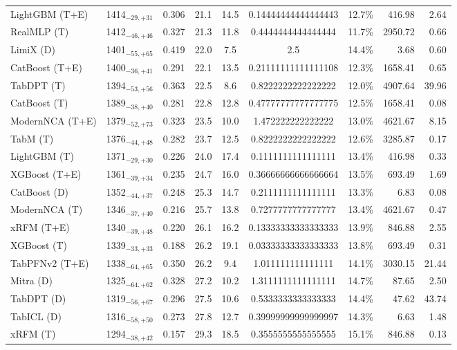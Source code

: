 \begin{tabular}{llcccccrr}
LightGBM (T+E) & 1414${}_{-29,+31}$ & 0.306 & 21.1 & 14.5 & 0.14444444444444443 & 12.7\% & 416.98 & 2.64 \\
RealMLP (T) & 1412${}_{-46,+46}$ & 0.327 & 21.3 & 11.8 & 0.4444444444444444 & 11.7\% & 2950.72 & 0.66 \\
LimiX (D) & 1401${}_{-55,+65}$ & 0.419 & 22.0 & 7.5 & 2.5 & 14.4\% & 3.68 & 0.60 \\
CatBoost (T+E) & 1400${}_{-36,+41}$ & 0.291 & 22.1 & 13.5 & 0.21111111111111108 & 12.3\% & 1658.41 & 0.65 \\
TabDPT (T) & 1394${}_{-53,+56}$ & 0.363 & 22.5 & 8.6 & 0.8222222222222222 & 12.0\% & 4907.64 & 39.96 \\
CatBoost (T) & 1389${}_{-38,+40}$ & 0.281 & 22.8 & 12.8 & 0.47777777777777775 & 12.5\% & 1658.41 & 0.08 \\
ModernNCA (T+E) & 1379${}_{-52,+73}$ & 0.323 & 23.5 & 10.0 & 1.472222222222222 & 13.0\% & 4621.67 & 8.15 \\
TabM (T) & 1376${}_{-44,+48}$ & 0.282 & 23.7 & 12.5 & 0.8222222222222222 & 12.6\% & 3285.87 & 0.17 \\
LightGBM (T) & 1371${}_{-29,+30}$ & 0.226 & 24.0 & 17.4 & 0.1111111111111111 & 13.4\% & 416.98 & 0.33 \\
XGBoost (T+E) & 1361${}_{-39,+34}$ & 0.235 & 24.7 & 16.0 & 0.36666666666666664 & 13.5\% & 693.49 & 1.69 \\
CatBoost (D) & 1352${}_{-44,+37}$ & 0.248 & 25.3 & 14.7 & 0.2111111111111111 & 13.3\% & 6.83 & 0.08 \\
ModernNCA (T) & 1346${}_{-37,+40}$ & 0.216 & 25.7 & 13.8 & 0.7277777777777777 & 13.4\% & 4621.67 & 0.47 \\
xRFM (T+E) & 1340${}_{-39,+48}$ & 0.220 & 26.1 & 16.2 & 0.13333333333333333 & 13.9\% & 846.88 & 2.55 \\
XGBoost (T) & 1339${}_{-33,+33}$ & 0.188 & 26.2 & 19.1 & 0.03333333333333333 & 13.8\% & 693.49 & 0.31 \\
TabPFNv2 (T+E) & 1338${}_{-64,+65}$ & 0.350 & 26.2 & 9.4 & 1.011111111111111 & 14.1\% & 3030.15 & 21.44 \\
Mitra (D) & 1325${}_{-64,+62}$ & 0.328 & 27.2 & 10.2 & 1.3111111111111111 & 14.7\% & 87.65 & 2.50 \\
TabDPT (D) & 1319${}_{-56,+67}$ & 0.296 & 27.5 & 10.6 & 0.5333333333333333 & 14.4\% & 47.62 & 43.74 \\
TabICL (D) & 1316${}_{-58,+50}$ & 0.273 & 27.8 & 12.7 & 0.39999999999999997 & 14.3\% & 6.63 & 1.48 \\
xRFM (T) & 1294${}_{-38,+42}$ & 0.157 & 29.3 & 18.5 & 0.3555555555555555 & 15.1\% & 846.88 & 0.13 \\

\end{tabular}
